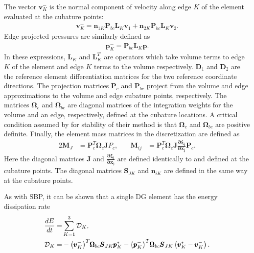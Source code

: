 The vector $\pmb{v}_{K}^{-}$ is the normal component of velocity along
edge $K$ of the element evaluated at the cubature points:
\begin{align}
  \pmb{v}^{-}_{K} = \pmb{n}_{1K} \pmb{P}_{bc} \pmb{L}_{K} \pmb{v}_{1}
  + \pmb{n}_{2K} \pmb{P}_{bc} \pmb{L}_{K} \pmb{v}_{2}.
\end{align}
Edge-projected pressures are similarly defined as
\begin{align}
  \pmb{p}_{K}^{-} = \pmb{P}_{bc}\pmb{L}_{K} \pmb{p}.
\end{align}
In these expressions, $\pmb{L}_{K}$ and $\pmb{L}_{K}^{T}$ are operators
which take volume terms to edge $K$ of the element and edge $K$ terms to
the volume respectively. $\pmb{D}_{1}$ and $\pmb{D}_{2}$ are the reference
element differentiation matrices for the two reference coordinate directions.
The projection matrices $\pmb{P}_{c}$ and $\pmb{P}_{bc}$ project from the volume and edge
approximations to the volume and edge cubature points, respectively. The matrices
$\pmb{\Omega}_{c}$ and $\pmb{\Omega}_{bc}$ are diagonal matrices of the integration weights for
the volume and an edge, respectively, defined at the cubature locations. A critical
condition assumed by \cite{kozdon2016stable} for stability of their method is that
$\pmb{\Omega}_{c}$ and $\pmb{\Omega}_{bc}$ are positive definite. Finally, the
element mass matrices in the discretization are defined as
\begin{alignat}{2}
  \pmb{M}_{J}  &= \pmb{P}_{c}^{T} \pmb{\Omega}_{c} \pmb{J} P_{c},\quad&
  \pmb{M}_{ij} &= \pmb{P}_{c}^{T} \pmb{\Omega}_{c} \pmb{J}
		  \frac{\pmb{\partial \xi_{i}}}{\pmb{\partial x_{j}}} \pmb{P}_{c}.
\end{alignat}
Here the diagonal matrices $\pmb{J}$ and $\pmb{\frac{\partial \xi_{i}}{\partial x_{j}}}$
are defined identically to  and defined at the cubature points.
The diagonal matrices $\pmb{S}_{JK}$ and $\pmb{n}_{iK}$ are defined in the same way at the cubature
points.

As with SBP, it can be shown that a single DG element has
the energy dissipation rate
\begin{align}
  \frac{dE}{dt} = & \sum_{K=1}^{3} \mathcal{D}_{K},\\
  \mathcal{D}_{K} = &
  - {\left(\pmb{v}_{K}^{-}\right)}^{T}\pmb{\Omega}_{bc}\pmb{S}_{JK}\pmb{p}_{K}^{*}
  - {\left(\pmb{p}_{K}^{-}\right)}^{T}\pmb{\Omega}_{bc}\pmb{S}_{JK}
  \left(\pmb{v}^{*}_{K} - \pmb{v}^{-}_{K}\right). \label{eq:dg_diss}
\end{align}

